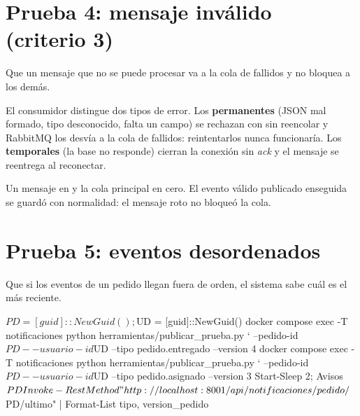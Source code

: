 \documentclass[11pt]{article}
\begin{document}
\section{Prueba 4: mensaje inválido (criterio 3)}

\queria Que un mensaje que no se puede procesar va a la cola de fallidos y no bloquea a los demás.

\comofunciona El consumidor distingue dos tipos de error. Los \textbf{permanentes} (JSON mal formado, tipo
desconocido, falta un campo) se rechazan con  sin reencolar y RabbitMQ los desvía a la cola
de fallidos: reintentarlos nunca funcionaría. Los \textbf{temporales} (la base no responde) cierran la
conexión sin \emph{ack} y el mensaje se reentrega al reconectar.


\observado Un mensaje en  y la cola principal en cero. El evento válido
publicado enseguida se guardó con normalidad: el mensaje roto no bloqueó la cola.

\section{Prueba 5: eventos desordenados}

\queria Que si los eventos de un pedido llegan fuera de orden, el sistema sabe cuál es el más reciente.

\begin{comando}
$PD = [guid]::NewGuid(); $UD = [guid]::NewGuid()
docker compose exec -T notificaciones python herramientas/publicar_prueba.py `
    --pedido-id $PD --usuario-id $UD --tipo pedido.entregado --version 4
docker compose exec -T notificaciones python herramientas/publicar_prueba.py `
    --pedido-id $PD --usuario-id $UD --tipo pedido.asignado --version 3
Start-Sleep 2; Avisos $PD
Invoke-RestMethod "http://localhost:8001/api/notificaciones/pedido/$PD/ultimo" | Format-List tipo, version_pedido
\end{comando}
\end{document}
